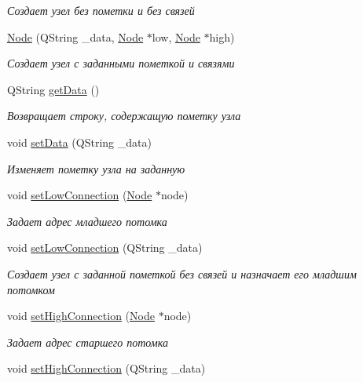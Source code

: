 \begin{DoxyCompactItemize}
\begin{DoxyCompactList}\small\item\em Создает узел без пометки и без связей \end{DoxyCompactList}\item 
\hyperlink{class_node_a184f393e8d61eea5e10fd6794cbd9c8d}{Node} (Q\+String \+\_\+data, \hyperlink{class_node}{Node} $\ast$low, \hyperlink{class_node}{Node} $\ast$high)
\begin{DoxyCompactList}\small\item\em Создает узел с заданными пометкой и связями \end{DoxyCompactList}\item 
Q\+String \hyperlink{class_node_ab3be314a19ff6049d0ab528ef3122139}{get\+Data} ()
\begin{DoxyCompactList}\small\item\em Возвращает строку, содержащую пометку узла \end{DoxyCompactList}\item 
void \hyperlink{class_node_a4ec7f6f38e67963aed6759a782db25a1}{set\+Data} (Q\+String \+\_\+data)
\begin{DoxyCompactList}\small\item\em Изменяет пометку узла на заданную \end{DoxyCompactList}\item 
void \hyperlink{class_node_afd304ef1773b4ee5e75e826c4b7b57b0}{set\+Low\+Connection} (\hyperlink{class_node}{Node} $\ast$node)
\begin{DoxyCompactList}\small\item\em Задает адрес младшего потомка \end{DoxyCompactList}\item 
void \hyperlink{class_node_ab8a35e02d194a5f378120db368a22ded}{set\+Low\+Connection} (Q\+String \+\_\+data)
\begin{DoxyCompactList}\small\item\em Создает узел с заданной пометкой без связей и назначает его младшим потомком \end{DoxyCompactList}\item 
void \hyperlink{class_node_a77ee961e6ac046ecc4f52e2cea94ad19}{set\+High\+Connection} (\hyperlink{class_node}{Node} $\ast$node)
\begin{DoxyCompactList}\small\item\em Задает адрес старшего потомка \end{DoxyCompactList}\item 
void \hyperlink{class_node_a14d42baec35f7dcbe6273fb4e91132e3}{set\+High\+Connection} (Q\+String \+\_\+data)

\end{DoxyCompactItemize}
